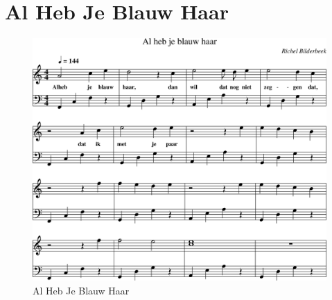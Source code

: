 \section{Al Heb Je Blauw Haar}



\begin{figure}[!htbp]
  \includegraphics[width=\textwidth,height=\textheight,keepaspectratio]{../songs/20_al_heb_je_blauw_haar.png}
  \caption{Al Heb Je Blauw Haar}
  \label{fig:20_al_heb_je_blauw_haar}
\end{figure}
